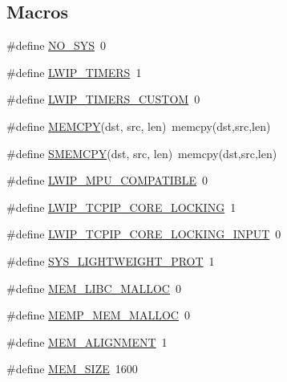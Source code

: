 \subsection*{Macros}
\begin{DoxyCompactItemize}
\item 
\#define \hyperlink{group__lwip__opts__nosys_gae00ba99de94a5bf84d832be8976df59b}{N\+O\+\_\+\+S\+YS}~0
\item 
\#define \hyperlink{group__lwip__opts__timers_ga25a41610055f91cbd0960256240b8f2c}{L\+W\+I\+P\+\_\+\+T\+I\+M\+E\+RS}~1
\item 
\#define \hyperlink{group__lwip__opts__timers_gaff0ea56f3e3d8e86c49b50557bc13815}{L\+W\+I\+P\+\_\+\+T\+I\+M\+E\+R\+S\+\_\+\+C\+U\+S\+T\+OM}~0
\item 
\#define \hyperlink{group__lwip__opts__memcpy_gaa1dd57a66b6de8c0593e9e3e8d1411f6}{M\+E\+M\+C\+PY}(dst,  src,  len)~memcpy(dst,src,len)
\item 
\#define \hyperlink{group__lwip__opts__memcpy_ga8c6e3c1e4f74acb16376188dbf8909ec}{S\+M\+E\+M\+C\+PY}(dst,  src,  len)~memcpy(dst,src,len)
\item 
\#define \hyperlink{group__lwip__opts__lock_gae9afcefa5d233372abb9413188dd98c9}{L\+W\+I\+P\+\_\+\+M\+P\+U\+\_\+\+C\+O\+M\+P\+A\+T\+I\+B\+LE}~0
\item 
\#define \hyperlink{group__lwip__opts__lock_ga8e46232794349c209e8ed4e9e7e4f011}{L\+W\+I\+P\+\_\+\+T\+C\+P\+I\+P\+\_\+\+C\+O\+R\+E\+\_\+\+L\+O\+C\+K\+I\+NG}~1
\item 
\#define \hyperlink{group__lwip__opts__lock_ga351beb1c06affe49e717bc9f76c66acf}{L\+W\+I\+P\+\_\+\+T\+C\+P\+I\+P\+\_\+\+C\+O\+R\+E\+\_\+\+L\+O\+C\+K\+I\+N\+G\+\_\+\+I\+N\+P\+UT}~0
\item 
\#define \hyperlink{group__lwip__opts__lock_gae85efb3a5fcf8585c94b3c2669978959}{S\+Y\+S\+\_\+\+L\+I\+G\+H\+T\+W\+E\+I\+G\+H\+T\+\_\+\+P\+R\+OT}~1
\item 
\#define \hyperlink{group__lwip__opts__mem_ga4ef345cc270912bd2230b1c5ec51dfc8}{M\+E\+M\+\_\+\+L\+I\+B\+C\+\_\+\+M\+A\+L\+L\+OC}~0
\item 
\#define \hyperlink{group__lwip__opts__mem_gae93af697d27bbcefa6a28052d90f2f38}{M\+E\+M\+P\+\_\+\+M\+E\+M\+\_\+\+M\+A\+L\+L\+OC}~0
\item 
\#define \hyperlink{group__lwip__opts__mem_ga97343214666ee6dcb18c0bd77b441ea7}{M\+E\+M\+\_\+\+A\+L\+I\+G\+N\+M\+E\+NT}~1
\item 
\#define \hyperlink{group__lwip__opts__mem_ga2dcf8c45f945dd0c4301a94700f2112c}{M\+E\+M\+\_\+\+S\+I\+ZE}~1600

\end{DoxyCompactItemize}
